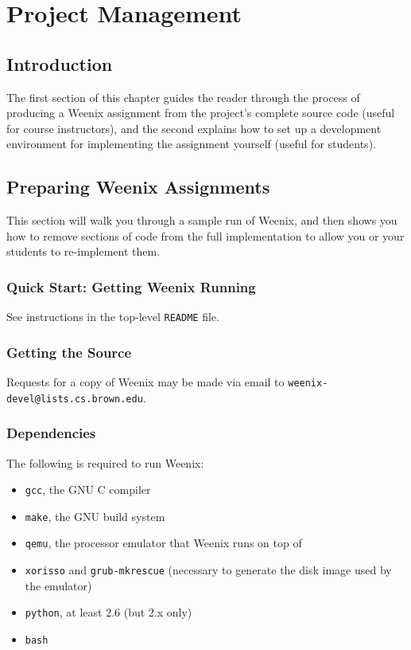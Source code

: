 \chapter{Project Management}
\label{project-management}

\section{Introduction}

The first section of this chapter guides the reader through the process of producing a Weenix assignment from the project's complete source code (useful for course instructors), and the second explains how to set up a development environment for implementing the assignment yourself (useful for students).

\section{Preparing Weenix Assignments}

This section will walk you through a sample run of Weenix, and then shows you how to remove sections of code from the full implementation to allow you or your students to re-implement them.

\subsection{Quick Start: Getting Weenix Running} \label{quickstart}

See instructions in the top-level \texttt{README} file.


\subsection{Getting the Source}
Requests for a copy of Weenix may be made via email to \texttt{weenix-devel@lists.cs.brown.edu}.
\subsection{Dependencies}
The following is required to run Weenix:

\begin{itemize}
\item \texttt{gcc}, the GNU C compiler %
\item \texttt{make}, the GNU build system
\item \texttt{qemu},%
the processor emulator that Weenix runs on top of
\item \texttt{xorisso} and \texttt{grub-mkrescue} (necessary to generate the disk image used by the emulator)
\item \texttt{python}, at least 2.6 (but 2.x only)
\item \texttt{bash}
\end{itemize}

